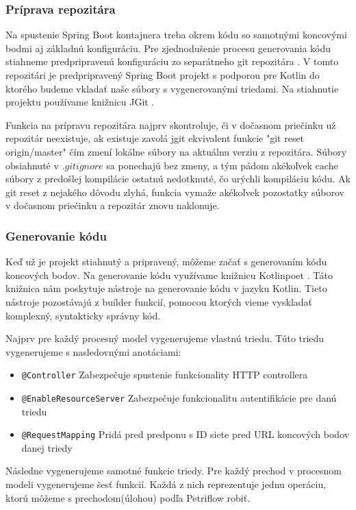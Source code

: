 \subsubsection{Príprava repozitára}
Na spustenie Spring Boot kontajnera treba okrem kódu so samotnými koncovými bodmi aj základnú konfiguráciu. Pre zjednodušenie procesu generovania kódu stiahneme predpripravenú konfiguráciu zo separátneho git repozitára \cite{dp_relay}. V tomto repozitári je predpripravený Spring Boot projekt s podporou pre Kotlin do ktorého budeme vkladať naše súbory s vygenerovanými triedami. Na stiahnutie projektu používame knižnicu JGit \cite{jgit}.

Funkcia na prípravu repozitára najprv skontroluje, či v dočasnom priečinku už repozitár neexistuje, ak existuje zavolá jgit ekvivalent funkcie "git reset origin/master" čím zmení lokálne súbory na aktuálnu verziu z repozitára. Súbory obsiahnuté v $.gitignore$ sa ponechajú bez zmeny, a tým pádom akékoľvek cache súbory z predošlej kompilácie ostatnú nedotknuté, čo urýchli kompiláciu kódu. Ak git reset z nejakého dôvodu zlyhá, funkcia vymaže akékoľvek pozostatky súborov v dočasnom priečinku a repozitár znovu naklonuje.

\subsubsection{Generovanie kódu}
Keď už je projekt stiahnutý a pripravený, môžeme začať s generovaním kódu koncových bodov. Na generovanie kódu  využívame knižnicu Kotlinpoet \cite{kotlinpoet}. Táto knižnica nám poskytuje nástroje na generovanie kódu v jazyku Kotlin. Tieto nástroje pozostávajú z builder funkcií, pomocou ktorých vieme vyskladať komplexný, syntakticky správny kód.

Najprv pre každý procesný model vygenerujeme vlastnú triedu. Túto triedu vygenerujeme s nasledovnými anotáciami:

\begin{itemize}
\item \texttt{@Controller} Zabezpečuje spustenie funkcionality HTTP controllera
\item \texttt{@EnableResourceServer} Zabezpečuje funkcionalitu  autentifikácie pre danú triedu
\item \texttt{@RequestMapping} Pridá pred predponu s ID siete pred URL koncových bodov danej triedy
\end{itemize}

Následne vygenerujeme samotné funkcie triedy. Pre každý prechod v procesnom modeli vygenerujeme šesť funkcií. Každá z nich reprezentuje jednu operáciu, ktorú môžeme s prechodom(úlohou) podľa Petriflow robiť.

